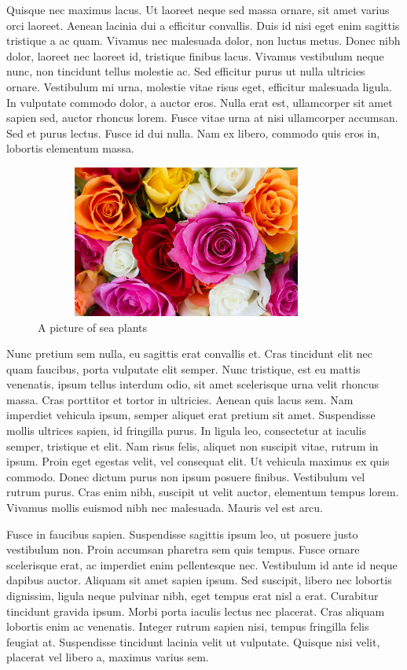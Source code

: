 \documentclass[a4paper,12pt]{article}
\begin{document}
	Quisque nec maximus lacus. Ut laoreet neque sed massa ornare, sit amet varius orci laoreet. Aenean lacinia dui a efficitur convallis. Duis id nisi eget enim sagittis tristique a ac quam. Vivamus nec malesuada dolor, non luctus metus. Donec nibh dolor, laoreet nec laoreet id, tristique finibus lacus. Vivamus vestibulum neque nunc, non tincidunt tellus molestie ac. Sed efficitur purus ut nulla ultricies ornare. Vestibulum mi urna, molestie vitae risus eget, efficitur malesuada ligula. In vulputate commodo dolor, a auctor eros. Nulla erat est, ullamcorper sit amet sapien sed, auctor rhoncus lorem. Fusce vitae urna at nisi ullamcorper accumsan. Sed et purus lectus. Fusce id dui nulla. Nam ex libero, commodo quis eros in, lobortis elementum massa.
	
	\begin{figure}[h!]
		\centering
		\includegraphics[width=10cm,height=5cm]{images/f1.jpg}
		\caption{A picture of sea plants}
		\label{fig:1}
	\end{figure}
	
	Nunc pretium sem nulla, eu sagittis erat convallis et. Cras tincidunt elit nec quam faucibus, porta vulputate elit semper. Nunc tristique, est eu mattis venenatis, ipsum tellus interdum odio, sit amet scelerisque urna velit rhoncus massa. Cras porttitor et tortor in ultricies. Aenean quis lacus sem. Nam imperdiet vehicula ipsum, semper aliquet erat pretium sit amet. Suspendisse mollis ultrices sapien, id fringilla purus. In ligula leo, consectetur at iaculis semper, tristique et elit. Nam risus felis, aliquet non suscipit vitae, rutrum in ipsum. Proin eget egestas velit, vel consequat elit. Ut vehicula maximus ex quis commodo. Donec dictum purus non ipsum posuere finibus. Vestibulum vel rutrum purus. Cras enim nibh, suscipit ut velit auctor, elementum tempus lorem. Vivamus mollis euismod nibh nec malesuada. Mauris vel est arcu.
	
	Fusce in faucibus sapien. Suspendisse sagittis ipsum leo, ut posuere justo vestibulum non. Proin accumsan pharetra sem quis tempus. Fusce ornare scelerisque erat, ac imperdiet enim pellentesque nec. Vestibulum id ante id neque dapibus auctor. Aliquam sit amet sapien ipsum. Sed suscipit, libero nec lobortis dignissim, ligula neque pulvinar nibh, eget tempus erat nisl a erat. Curabitur tincidunt gravida ipsum. Morbi porta iaculis lectus nec placerat. Cras aliquam lobortis enim ac venenatis. Integer rutrum sapien nisi, tempus fringilla felis feugiat at. Suspendisse tincidunt lacinia velit ut vulputate. Quisque nisi velit, placerat vel libero a, maximus varius sem.
	
\end{document}
